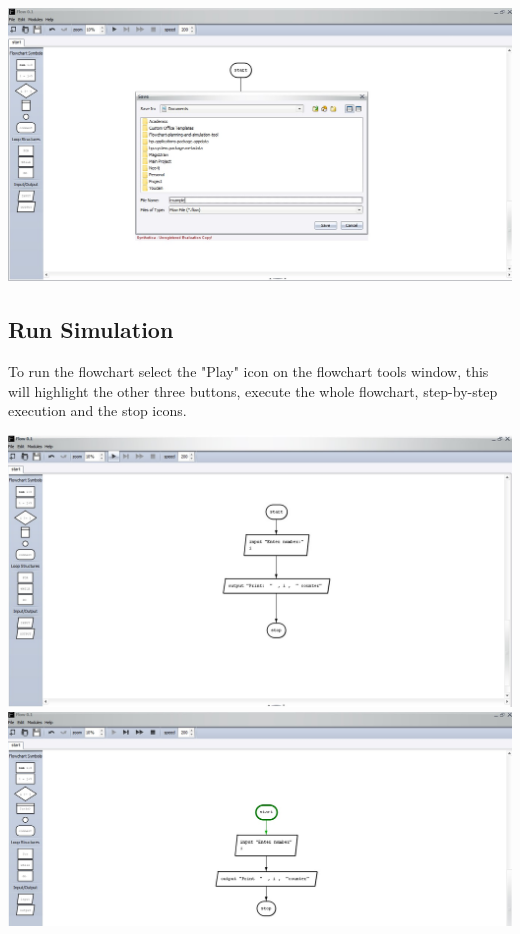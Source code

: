 \documentclass[11pt,a4paper,titlepage]{article}
\begin{document}
	\includegraphics[width=14cm]{images/saveFile.jpg}
	
	\subsection{Run Simulation}
	To run the flowchart select the "Play" icon on the flowchart tools window, this will highlight the other three buttons, execute the whole flowchart, step-by-step execution and the stop icons.\newline \newline
	
	\includegraphics[width=14cm]{images/runSimulator.jpg}\newline\newline
	\includegraphics[width=14cm]{images/runSimulator2.jpg}
		
\end{document}
